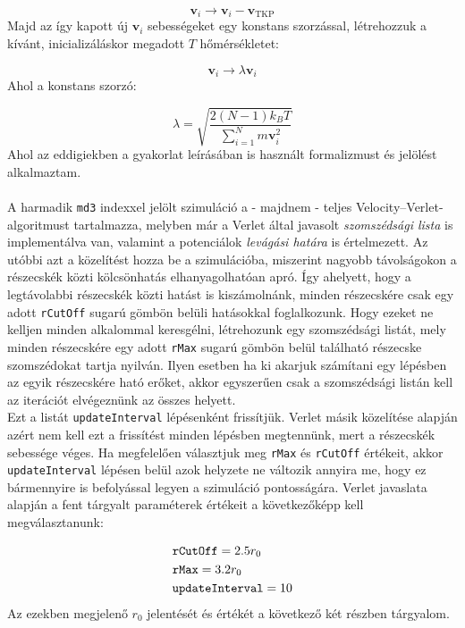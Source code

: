 \begin{multicols}{2}
\begin{equation}
    \boldsymbol{v}_{i}
    \to
    \boldsymbol{v}_{i} - \boldsymbol{v}_{\text{TKP}}
\end{equation}
Majd az így kapott új $\boldsymbol{v}_{i}$ sebességeket egy konstans szorzással, létrehozzuk a kívánt, inicializáláskor megadott $T$ hőmérsékletet:

\begin{equation}
    \boldsymbol{v}_{i}
    \to
    \lambda \boldsymbol{v}_{i}
\end{equation}
Ahol a konstans szorzó:

\begin{equation}
    \lambda
    =
    \sqrt{\frac{2 \left( N - 1 \right) k_{B} T}{\sum_{i = 1}^{N} m \boldsymbol{v}_{i}^{2}}}
\end{equation}
Ahol az eddigiekben a gyakorlat leírásában is használt formalizmust és jelölést alkalmaztam\cite{szamszim}.
\\ \\
A harmadik \texttt{md3} indexxel jelölt szimuláció a - majdnem - teljes Velocity--Verlet-algoritmust tartalmazza, melyben már a Verlet által javasolt \textit{szomszédsági lista} is implementálva van, valamint a potenciálok \textit{levágási határa} is értelmezett. Az utóbbi azt a közelítést hozza be a szimulációba, miszerint nagyobb távolságokon a részecskék közti kölcsönhatás elhanyagolhatóan apró. Így ahelyett, hogy a legtávolabbi részecskék közti hatást is kiszámolnánk, minden részecskére csak egy adott \texttt{rCutOff} sugarú gömbön belüli hatásokkal foglalkozunk. Hogy ezeket ne kelljen minden alkalommal keresgélni, létrehozunk egy szomszédsági listát, mely minden részecskére egy adott \texttt{rMax} sugarú gömbön belül található részecske szomszédokat tartja nyilván. Ilyen esetben ha ki akarjuk számítani egy lépésben az egyik 
részecskére ható erőket, akkor egyszerűen csak a szomszédsági listán kell az iterációt elvégeznünk az összes helyett. \\
Ezt a listát \texttt{updateInterval} lépésenként frissítjük. Verlet másik közelítése alapján azért nem kell ezt a frissítést minden lépésben megtennünk, mert a részecskék sebessége véges. Ha megfelelően választjuk meg \texttt{rMax} és \texttt{rCutOff} értékeit, akkor \texttt{updateInterval} lépésen belül azok helyzete ne változik annyira me, hogy ez bármennyire is befolyással legyen a szimuláció pontosságára. Verlet javaslata alapján a fent tárgyalt paraméterek értékeit a következőképp kell megválasztanunk:

\begin{align*}
    &\text{\texttt{rCutOff}} = 2.5 r_{0} \\
    &\text{\texttt{rMax}} = 3.2 r_{0} \\
    &\text{\texttt{updateInterval}} = 10
\end{align*}
Az ezekben megjelenő $r_{0}$ jelentését és értékét a következő két részben tárgyalom.


\end{multicols}

